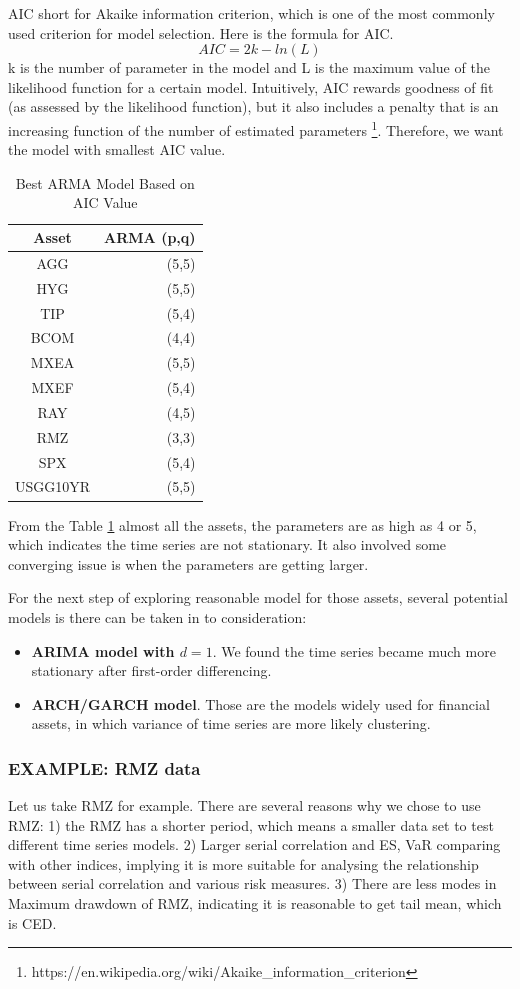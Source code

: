 \documentclass[12pt]{article}
\begin{document}
AIC short for Akaike information criterion, which is one of the most commonly used criterion for model selection. Here is the formula for AIC.
\[
AIC = 2k - ln(L)
\]
k is the number of parameter in the model and L is the maximum value of the likelihood function for a certain model. Intuitively, AIC rewards goodness of fit (as assessed by the likelihood function), but it also includes a penalty that is an increasing function of the number of estimated parameters \footnote{https://en.wikipedia.org/wiki/Akaike\_information\_criterion}. Therefore, we want the model with smallest AIC value.

\begin{table}[!h]
\caption{Best ARMA Model Based on AIC Value}
\centering 
\begin{tabular}{ | c || r | } 
 \hline
Asset & ARMA (p,q) \\
  \hline \hline
AGG & (5,5)\\ 
HYG & (5,5) \\ 
TIP & (5,4)  \\ 
BCOM & (4,4) \\ 
MXEA & (5,5)  \\ 
MXEF & (5,4) \\ 
RAY & (4,5)  \\ 
RMZ & (3,3)  \\ 
SPX & (5,4) \\ 
USGG10YR & (5,5) \\
 \hline
\end{tabular}
\label{table:bestArmaModel}
\end{table}

From the Table \ref{table:bestArmaModel} almost all the assets, the parameters are as high as 4 or 5, which indicates the time series are not stationary. It also involved some converging issue is when the parameters are getting larger.

For the next step of exploring reasonable model for those assets, several potential models is there can be taken in to consideration:
\begin{itemize}
\item \textbf{ARIMA model with $d=1$}. We found the time series became much more stationary after first-order differencing. 
\item \textbf{ARCH/GARCH model}. Those are the models widely used for financial assets, in which variance of time series are more likely clustering.
\end{itemize}

\subsubsection{EXAMPLE: RMZ data}
Let us take RMZ for example. There are several reasons why we chose to use RMZ: 1) the RMZ has a shorter period, which means a smaller data set to test different time series models. 2) Larger serial correlation and ES, VaR comparing with other indices, implying it is more suitable for analysing the relationship between serial correlation and various risk measures. 3) There are less modes in Maximum drawdown of RMZ, indicating it is reasonable to get tail mean, which is CED.
\end{document}
